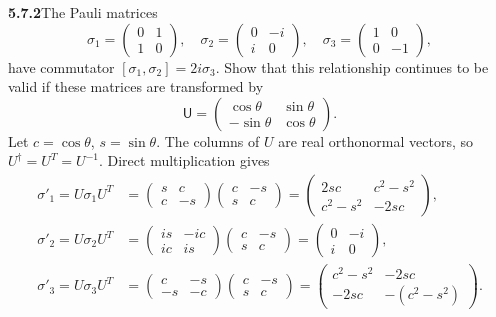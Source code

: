 \par\bigskip
\noindent\textbf{5.7.2}\quad The Pauli matrices
\[
\sigma_{1}=\begin{pmatrix}0&1\\1&0\end{pmatrix},\quad
\sigma_{2}=\begin{pmatrix}0&-i\\i&0\end{pmatrix},\quad
\sigma_{3}=\begin{pmatrix}1&0\\0&-1\end{pmatrix},
\]
have commutator $[\sigma_{1},\sigma_{2}]=2i\sigma_{3}$. Show that this
relationship continues to be valid if these matrices are transformed by
\[
\mathsf{U}=\begin{pmatrix}\cos\theta&\sin\theta\\
-\sin\theta&\cos\theta\end{pmatrix}.
\]
\solution
Let $c=\cos\theta$, $s=\sin\theta$. The columns of $U$ are real
orthonormal vectors, so $U^\dagger=U^T=U^{-1}$. Direct multiplication
gives
\begin{align*}
\sigma'_1=U\sigma_1U^T
&=\begin{pmatrix}s&c\\c&-s\end{pmatrix}
  \begin{pmatrix}c&-s\\s&c\end{pmatrix}
=\begin{pmatrix}2sc&c^2-s^2\\c^2-s^2&-2sc\end{pmatrix},\\
\sigma'_2=U\sigma_2U^T
&=\begin{pmatrix}is&-ic\\ic&is\end{pmatrix}
  \begin{pmatrix}c&-s\\s&c\end{pmatrix}
=\begin{pmatrix}0&-i\\i&0\end{pmatrix},\\
\sigma'_3=U\sigma_3U^T
&=\begin{pmatrix}c&-s\\-s&-c\end{pmatrix}
  \begin{pmatrix}c&-s\\s&c\end{pmatrix}
=\begin{pmatrix}c^2-s^2&-2sc\\-2sc&-(c^2-s^2)\end{pmatrix}.
\end{align*}
